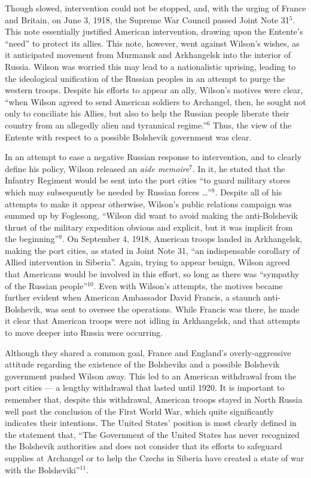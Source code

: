 \begin{justify}
  \hspace{.5in} Though slowed, intervention could not be stopped, and, with the urging of France and Britain, on June 3, 1918, the Supreme War Council passed Joint Note 31$^5$. This note essentially justified American intervention, drawing upon the Entente's ``need'' to protect its allies. This note, however, went against Wilson's wishes, as it anticipated movement from Murmansk and Arkhangelsk into the interior of Russia. Wilson was worried this may lead to a nationalistic uprising, leading to the ideological unification of the Russian peoples in an attempt to purge the western troops. Despite his efforts to appear an ally, Wilson's motives were clear, ``when Wilson agreed to send American soldiers to Archangel, then, he sought not only to conciliate his Allies, but also to help the Russian people liberate their country from an allegedly alien and tyrannical regime.''$^6$ Thus, the view of the Entente with respect to a possible Bolshevik government was clear.

  \hspace{.5in} In an attempt to ease a negative Russian response to intervention, and to clearly define his policy, Wilson released an \textit{aide memoire}$^7$. In it, he stated that the  Infantry Regiment would be sent into the port cities ``to guard military stores which may subsequently be needed by Russian forces \ldots''$^8$. Despite all of his attempts to make it appear otherwise, Wilson's public relations campaign was summed up by Foglesong, ``Wilson did want to avoid making the anti-Bolshevik thrust of the military expedition obvious and explicit, but it was implicit from the beginning''$^9$. On September 4, 1918, American troops landed in Arkhangelsk, making the port cities, as stated in Joint Note 31, ``an indispensable corollary of Allied intervention in Siberia''. Again, trying to appear benign, Wilson agreed that Americans would be involved in this effort, so long as there was ``sympathy of the Russian people''$^{10}$. Even with Wilson's attempts, the motives became further evident when American Ambassador David Francis, a staunch anti-Bolshevik, was sent to oversee the operations. While Francis was there, he made it clear that American troops were not idling in Arkhangelsk, and that attempts to move deeper into Russia were occurring. 

  \hspace{.5in} Although they shared a common goal, France and England's overly-aggressive attitude regarding the existence of the Bolsheviks and a possible Bolshevik government pushed Wilson away. This led to an American withdrawal from the port cities — a lengthy withdrawal that lasted until 1920. It is important to remember that, despite this withdrawal, American troops stayed in North Russia well past the conclusion of the First World War, which quite significantly indicates their intentions. The United States' position is most clearly defined in the statement that, ``The Government of the United States has never recognized the Bolshevik authorities and does not consider that its efforts to safeguard supplies at Archangel or to help the Czechs in Siberia have created a state of war with the Bolsheviki''$^{11}$.


\end{justify}
